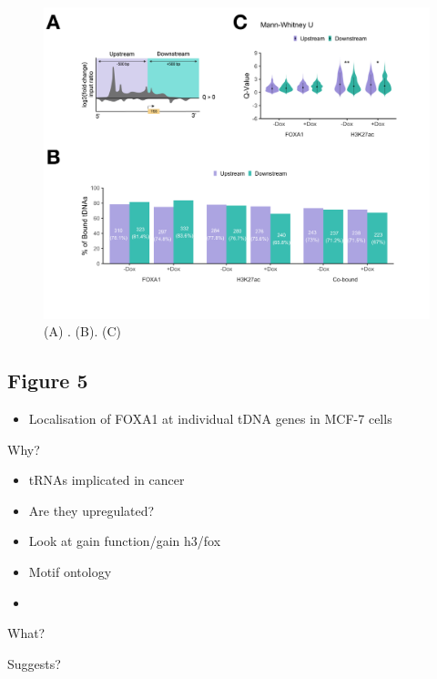 \documentclass[
  12pt,
]{article}
\providecommand{\tightlist}{%
  \setlength{\itemsep}{0pt}\setlength{\parskip}{0pt}}
\begin{document}
\begin{figure}[H]
\includegraphics[width=1\linewidth]{../images/results-04} \caption{(A) . (B). (C)}\label{fig:results-4}
\end{figure}

\hypertarget{figure-5}{%
\subsection{Figure 5}\label{figure-5}}

\begin{itemize}
\tightlist
\item
  Localisation of FOXA1 at individual tDNA genes in MCF-7 cells
\end{itemize}

Why?

\begin{itemize}
\item
  tRNAs implicated in cancer
\item
  Are they upregulated?
\item
  Look at gain function/gain h3/fox
\item
  Motif ontology
\item
\end{itemize}

What?

Suggests?
\end{document}
